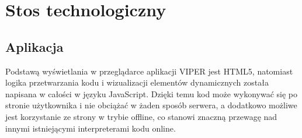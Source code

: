 \documentclass[a4paper,twoside,openright,11pt]{report}
\begin{document}
  \chapter{Stos technologiczny}

  \section{Aplikacja}
\par Podstawą wyświetlania w przeglądarce aplikacji VIPER jest HTML5, natomiast logika przetwarzania kodu i wizualizacji elementów dynamicznych została napisana w całości w języku JavaScript. Dzięki temu kod może wykonywać się po stronie użytkownika i nie obciążać w żaden sposób serwera, a dodatkowo możliwe jest korzystanie ze strony w trybie offline, co stanowi znaczną przewagę nad innymi istniejącymi interpreterami kodu online.
\end{document}
